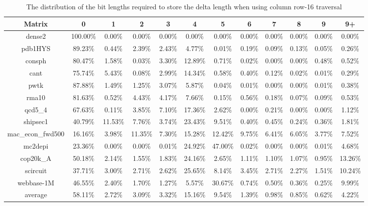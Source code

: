 \begin{sidewaystable}
\centering
\begin{threeparttable}
    \caption[The distribution of deltas by bit length]{The distribution of the bit lengths required to store the delta length when using column row-16 traversal}
\label{tbl:indexDist}
\begin{tabular}{cccccccccccc}
\hline
\bfseries Matrix & \bfseries 0 & \bfseries 1 & \bfseries 2 & \bfseries 3 & \bfseries 4 & \bfseries 5 & \bfseries 6 &\bfseries 7 & \bfseries 8 & \bfseries 9 & \bfseries 9+\\
\hline
dense2 & 100.00\% & 0.00\% & 0.00\% & 0.00\% & 0.00\% & 0.00\% & 0.00\% & 0.00\% & 0.00\% & 0.00\% & 0.00\% \\
pdb1HYS & 89.23\% & 0.44\% & 2.39\% & 2.43\% & 4.77\% & 0.01\% & 0.19\% & 0.09\% & 0.13\% & 0.05\% & 0.26\% \\
consph & 80.47\% & 1.58\% & 0.03\% & 3.30\% & 12.89\% & 0.71\% & 0.02\% & 0.00\% & 0.00\% & 0.48\% & 0.52\% \\
cant & 75.74\% & 5.43\% & 0.08\% & 2.99\% & 14.34\% & 0.58\% & 0.40\% & 0.12\% & 0.02\% & 0.01\% & 0.29\% \\
pwtk & 87.88\% & 1.49\% & 1.25\% & 3.07\% & 5.87\% & 0.04\% & 0.01\% & 0.00\% & 0.00\% & 0.01\% & 0.38\% \\
rma10 & 81.63\% & 0.52\% & 4.43\% & 4.17\% & 7.66\% & 0.15\% & 0.56\% & 0.18\% & 0.07\% & 0.09\% & 0.53\% \\
qcd5\_4 & 67.63\% & 0.11\% & 3.85\% & 7.10\% & 17.36\% & 2.62\% & 0.00\% & 0.21\% & 0.00\% & 0.00\% & 1.12\% \\
shipsec1 & 40.79\% & 11.53\% & 7.76\% & 3.74\% & 23.43\% & 9.51\% & 0.40\% & 0.45\% & 0.24\% & 0.36\% & 1.81\% \\
mac\_econ\_fwd500 & 16.16\% & 3.98\% & 11.35\% & 7.30\% & 15.28\% & 12.42\% & 9.75\% & 6.41\% & 6.05\% & 3.77\% & 7.52\% \\
mc2depi & 23.36\% & 0.00\% & 0.00\% & 0.01\% & 24.92\% & 47.00\% & 0.02\% & 0.00\% & 0.00\% & 0.01\% & 4.68\% \\
cop20k\_A & 50.18\% & 2.14\% & 1.55\% & 1.83\% & 24.16\% & 2.65\% & 1.11\% & 1.10\% & 1.07\% & 0.95\% & 13.26\% \\
scircuit & 37.71\% & 3.00\% & 2.71\% & 2.62\% & 25.65\% & 8.14\% & 3.45\% & 2.71\% & 2.27\% & 1.51\% & 10.24\% \\
webbase-1M & 46.55\% & 2.40\% & 1.70\% & 1.27\% & 5.57\% & 30.67\% & 0.74\% & 0.50\% & 0.36\% & 0.25\% & 9.99\% \\
\hline
average\tnote{a} & 58.11\% & 2.72\% & 3.09\% & 3.32\% & 15.16\% & 9.54\% & 1.39\% & 0.98\% & 0.85\% & 0.62\% & 4.22\% \\


\end{tabular}
\end{threeparttable}
\end{sidewaystable}
